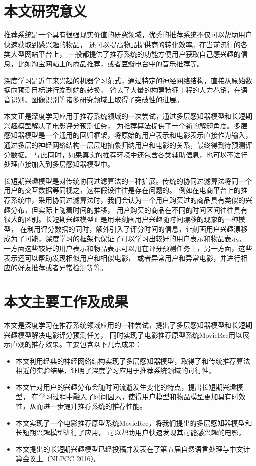 \section{本文研究意义}
推荐系统是一个具有很强现实价值的研究领域，优秀的推荐系统不仅可以帮助用户快速获取到感兴趣的物品，
还可以提高物品提供商的转化效率。在当前流行的各类大型网站平台上，
一般都提供了推荐系统的功能方便用户获取自己感兴趣的信息，比如淘宝网站上的商品推荐，或者豆瓣电台中的音乐推荐等。

深度学习是近年来兴起的机器学习范式，通过特定的神经网络结构，直接从原始数据向预测目标进行端到端的转换，
省去了大量的构建特征工程的人力花销，在语音识别、图像识别等诸多研究领域上取得了突破性的进展。

本文正是深度学习应用于推荐系统领域的一次尝试，通过多层感知器模型和长短期兴趣模型解决了电影评分预测任务，
为推荐算法提供了一个新的解题角度。多层感知器模型是一个通用的回归框架，将原始的用户表示和电影表示直接作为输入，
通过多层的神经网络结构一层层地抽象归纳用户和电影的关系，最终得到待预测评分数据。
与此同时，如果真实的推荐环境中还包含各类辅助信息，也可以不进行处理直接加入到多层感知器模型中。

长短期兴趣模型是对传统协同过滤算法的一种扩展。传统的协同过滤算法将同一个用户的交互数据等同视之，这样假设往往是存在问题的。
例如在电商平台上的推荐系统中，采用协同过滤算法时，我们会认为一个用户购买过的商品具有类似的兴趣分布，但实际上随着时间的推移，
用户购买的商品在不同的时间区间往往具有很大的区别。长短期兴趣模型正是用来刻画用户兴趣随时间漂移的现象的一种模型，
在利用评分数据的同时，额外引入了评分时间的信息，让刻画用户兴趣漂移成为了可能，深度学习的框架也保证了可以学习出较好的用户表示和物品表示。
一方面这些较好的用户表示和物品表示可以用在评分预测任务上，另一方面，这些表示还可以帮助发现相似用户和相似电影，
或者异常用户和异常电影，并进行相应的好友推荐或者异常检测等等。

\section{本文主要工作及成果}
本文是深度学习在推荐系统领域应用的一种尝试，提出了多层感知器模型和长短期兴趣模型解决电影评分预测任务，
同时实现了电影推荐原型系统MovieRec用以展示直观的推荐效果。主要包含以下几点成果：

\begin{itemize}
\item
本文利用经典的神经网络结构实现了多层感知器模型，取得了和传统推荐算法相近的实验结果，证明了深度学习应用于推荐系统领域的可行性。
\item
本文针对用户的兴趣分布会随时间流逝发生变化的特点，提出长短期兴趣模型，
在学习过程中融入了时间因素，使得用户模型和物品模型更加具有时效性，从而进一步提升推荐系统的推荐性能。
\item
本文实现了一个电影推荐原型系统MovieRec，将我们提出的多层感知器模型和长短期兴趣模型进行了应用，
可以帮助用户快速发现其可能感兴趣的电影。
\item
本文提出的长短期兴趣模型已经投稿并发表在了第五届自然语言处理与中文计算会议上（NLPCC 2016）。
\end{itemize}

